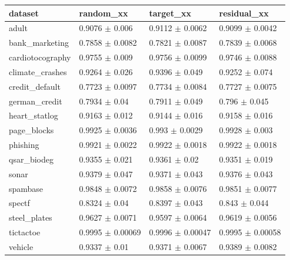 \begin{tabular}{llll}
\toprule
dataset & random\_xx & target\_xx & residual\_xx \\
\midrule
adult & 0.9076 $\pm$ 0.006 & 0.9112 $\pm$ 0.0062 & 0.9099 $\pm$ 0.0042 \\
bank\_marketing & 0.7858 $\pm$ 0.0082 & 0.7821 $\pm$ 0.0087 & 0.7839 $\pm$ 0.0068 \\
cardiotocography & 0.9755 $\pm$ 0.009 & 0.9756 $\pm$ 0.0099 & 0.9746 $\pm$ 0.0088 \\
climate\_crashes & 0.9264 $\pm$ 0.026 & 0.9396 $\pm$ 0.049 & 0.9252 $\pm$ 0.074 \\
credit\_default & 0.7723 $\pm$ 0.0097 & 0.7734 $\pm$ 0.0084 & 0.7727 $\pm$ 0.0075 \\
german\_credit & 0.7934 $\pm$ 0.04 & 0.7911 $\pm$ 0.049 & 0.796 $\pm$ 0.045 \\
heart\_statlog & 0.9163 $\pm$ 0.012 & 0.9144 $\pm$ 0.016 & 0.9158 $\pm$ 0.016 \\
page\_blocks & 0.9925 $\pm$ 0.0036 & 0.993 $\pm$ 0.0029 & 0.9928 $\pm$ 0.003 \\
phishing & 0.9921 $\pm$ 0.0022 & 0.9922 $\pm$ 0.0018 & 0.9922 $\pm$ 0.0018 \\
qsar\_biodeg & 0.9355 $\pm$ 0.021 & 0.9361 $\pm$ 0.02 & 0.9351 $\pm$ 0.019 \\
sonar & 0.9379 $\pm$ 0.047 & 0.9371 $\pm$ 0.043 & 0.9376 $\pm$ 0.043 \\
spambase & 0.9848 $\pm$ 0.0072 & 0.9858 $\pm$ 0.0076 & 0.9851 $\pm$ 0.0077 \\
spectf & 0.8324 $\pm$ 0.04 & 0.8397 $\pm$ 0.043 & 0.843 $\pm$ 0.044 \\
steel\_plates & 0.9627 $\pm$ 0.0071 & 0.9597 $\pm$ 0.0064 & 0.9619 $\pm$ 0.0056 \\
tictactoe & 0.9995 $\pm$ 0.00069 & 0.9996 $\pm$ 0.00047 & 0.9995 $\pm$ 0.00058 \\
vehicle & 0.9337 $\pm$ 0.01 & 0.9371 $\pm$ 0.0067 & 0.9389 $\pm$ 0.0082 \\
\bottomrule
\end{tabular}
